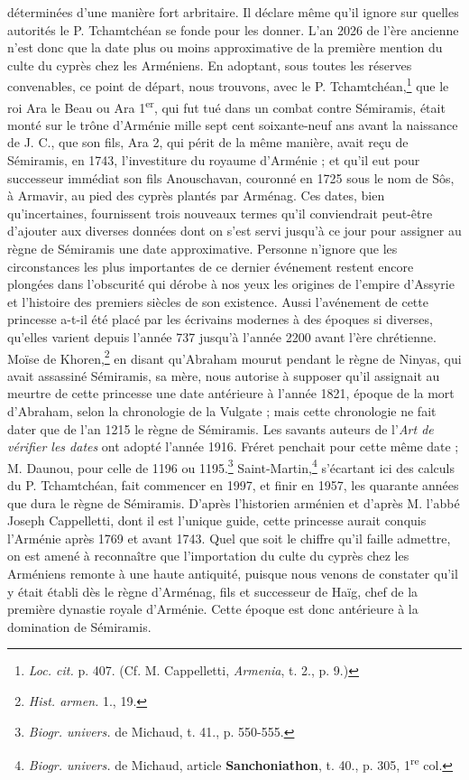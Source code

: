 \documentclass{article}
\begin{document}
déterminées d'une manière fort arbritaire. Il déclare même qu'il ignore sur quelles autorités le P. Tchamtchéan se fonde pour les donner. L'an 2026 de l'ère ancienne n'est donc que la date plus ou moins approximative de la première mention du culte du cyprès chez les Arméniens. En adoptant, sous toutes les réserves convenables, ce point de départ, nous trouvons, avec le P. Tchamtchéan,\footnote{\emph{Loc. cit.} p. 407. (Cf. M. Cappelletti, \emph{Armenia}, t. 2., p. 9.)} que le roi Ara le Beau ou Ara 1\textsuperscript{er}, qui fut tué dans un combat contre Sémiramis, était monté sur le trône d'Arménie mille sept cent soixante-neuf ans avant la naissance de J. C., que son fils, Ara 2, qui périt de la même manière, avait reçu de Sémiramis, en 1743, l'investiture du royaume d'Arménie ; et qu'il eut pour successeur immédiat son fils Anouschavan, couronné en 1725 sous le nom de Sôs, à Armavir, au pied des cyprès plantés par Arménag. Ces dates, bien qu'incertaines, fournissent trois nouveaux termes qu'il conviendrait peut-être d'ajouter aux diverses données dont on s'est servi jusqu'à ce jour pour assigner au règne de Sémiramis une date approximative. Personne n'ignore que les circonstances les plus importantes de ce dernier événement restent encore plongées dans l'obscurité qui dérobe à nos yeux les origines de l'empire d'Assyrie et l'histoire des premiers siècles de son existence. Aussi l'avénement de cette princesse a-t-il été placé par les écrivains modernes à des époques si diverses, qu'elles varient depuis l'année 737 jusqu'à l'année 2200 avant l'ère chrétienne. Moïse de Khoren,\footnote{\emph{Hist. armen.} 1., 19.} en disant qu'Abraham mourut pendant le règne de Ninyas, qui avait assassiné Sémiramis, sa mère, nous autorise à supposer qu'il assignait au meurtre de cette princesse une date antérieure à l'année 1821, époque de la mort d'Abraham, selon la chronologie de la Vulgate ; mais cette chronologie ne fait dater que de l'an 1215 le règne de Sémiramis. Les savants auteurs de l'\emph{Art de vérifier les dates} ont adopté l'année 1916. Fréret penchait pour cette même date ; M. Daunou, pour celle de 1196 ou 1195.\footnote{\emph{Biogr. univers.} de Michaud, t. 41., p. 550-555.} Saint-Martin,\footnote{\emph{Biogr. univers.} de Michaud, article \textbf{Sanchoniathon}, t. 40., p. 305, 1\textsuperscript{re} col.} s'écartant ici des calculs du P. Tchamtchéan, fait commencer en 1997, et finir en 1957, les quarante années que dura le règne de Sémiramis. D'après l'historien arménien et d'après M. l'abbé Joseph Cappelletti, dont il est l'unique guide, cette princesse aurait conquis l'Arménie après 1769 et avant 1743. Quel que soit le chiffre qu'il faille admettre, on est amené à reconnaître que l'importation du culte du cyprès chez les Arméniens remonte à une haute antiquité, puisque nous venons de constater qu'il y était établi dès le règne d'Arménag, fils et successeur de Haïg, chef de la première dynastie royale d'Arménie. Cette époque est donc antérieure à la domination de Sémiramis.
\end{document}
